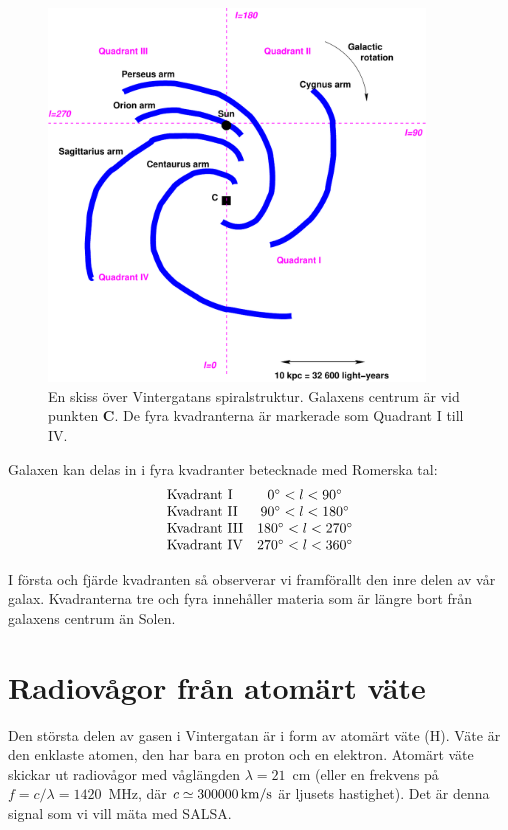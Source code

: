 \begin{figure}[ht]
\begin{center}
\includegraphics[width=10cm]{../figures/mwsketch.pdf}
\end{center}
\caption{ En skiss över Vintergatans spiralstruktur. Galaxens centrum är vid
punkten {\bf C}. De fyra kvadranterna är markerade som Quadrant I till IV. }
\label{figmwsketch}
\end{figure}  

Galaxen kan delas in i fyra kvadranter betecknade med Romerska tal: 
\bigskip
\begin{displaymath}
\begin{array}{lc}
\hbox{Kvadrant {\sc I}} 	&0\deg < l < 90\deg	\\
\hbox{Kvadrant ${\rm II}$} 	&90\deg < l < 180\deg	\\
\hbox{Kvadrant ${\rm III}$} 	&180\deg < l < 270\deg	\\
\hbox{Kvadrant ${\rm IV}$} 	&270\deg < l < 360\deg 
\end{array}
\end{displaymath}
\bigskip

I första och fjärde kvadranten så observerar vi framförallt den inre delen
av vår galax. Kvadranterna tre och fyra innehåller materia som är längre
bort från galaxens centrum än Solen. 

\section{Radiovågor från atomärt väte}
Den största delen av gasen i Vintergatan är i form av atomärt väte (H).  Väte
är den enklaste atomen, den har bara en proton och en elektron.  Atomärt väte
skickar ut radiovågor med våglängden $\lambda= 21$~cm (eller en frekvens
på$f=c/\lambda=1420$~MHz, där $c\simeq 300 000\, {\rm km/s}$ är ljusets
hastighet). Det är denna signal som vi vill mäta med SALSA.

